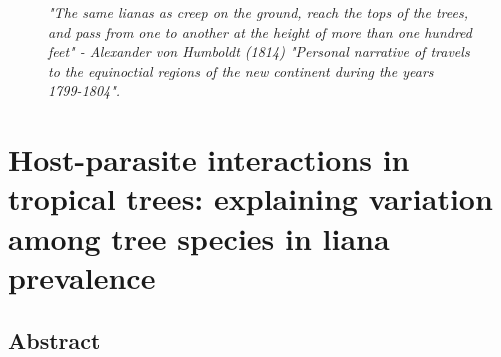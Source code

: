 \documentclass[b5paper,justified]{tufte-book} %
\begin{document}
\vspace*{20cm}

\begin{landscape}
\begin{figure}
\vspace*{-.6cm}\hspace*{4.4cm}
\hspace*{5cm}\begin{minipage}{18cm}

\textit{ \footnotesize "The same lianas as creep on the ground, reach the tops of the trees, and pass from one to another at the height of more than one hundred feet" - Alexander von Humboldt  (1814) "Personal narrative of travels to the equinoctial regions of the new continent during the years 1799-1804".}

\end{minipage}
\end{figure}
\end{landscape}
	


\chapter{Host-parasite interactions in tropical trees: explaining variation among tree species in liana prevalence}
\label{ch8} 

\section{Abstract} 
\end{document}
